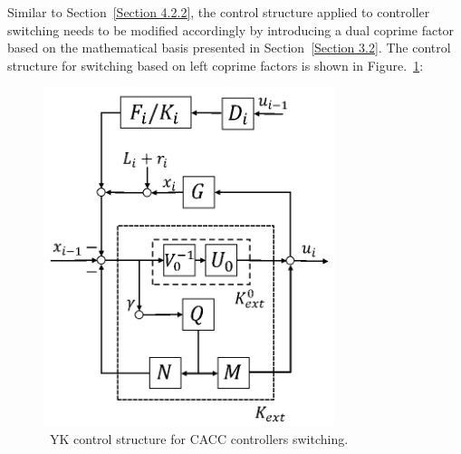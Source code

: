\documentclass[journal]{IEEEtran}
\begin{document}
Similar to Section~\ref{Section 4.2.2}, the control structure applied to controller switching needs to be modified accordingly by introducing a dual coprime factor based on the mathematical basis presented in Section~\ref{Section 3.2}. The control structure for switching based on left coprime factors is shown in Figure.~\ref{fig8}:

\begin{figure}
  \centering
  \includegraphics[width=8.5cm]{figs/fig8.png}
  \caption{~YK control structure for CACC controllers switching.}
  \label{fig8}
\end{figure}
\end{document}
